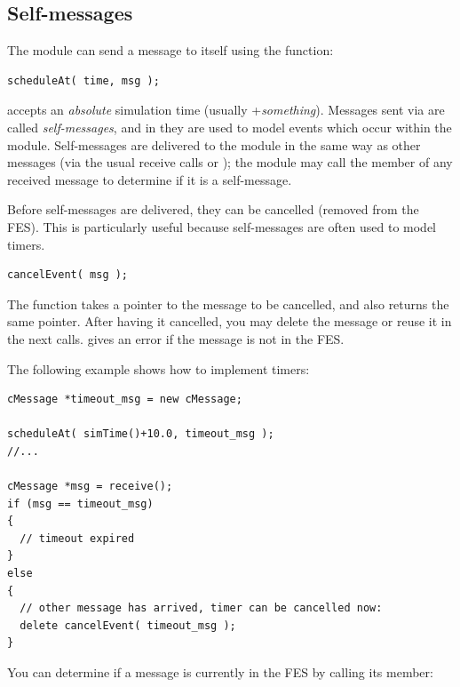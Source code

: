 \subsection{Self-messages}
\label{sec:ch-sim-lib:self-messages}

The module can send a message to itself using the
 function:

\begin{verbatim}
scheduleAt( time, msg );
\end{verbatim}

 accepts an \textit{absolute} simulation time
(usually +\textit{something}).  Messages sent via
 are called \textit{self-messages}, and in {\opp}
they are used to model events which occur within the module.
Self-messages are delivered to the module in the same way as other
messages (via the usual receive calls or ); the
module may call the  member of any received
message to determine if it is a self-message.


Before self-messages are delivered, they can be
cancelled
(removed from the FES). This is particularly useful because
self-messages are often used to model timers.

\begin{verbatim}
cancelEvent( msg );
\end{verbatim}


The  function takes a pointer to the message to
be cancelled, and also returns the same pointer. After having it
cancelled, you may delete the message or reuse it in the next
 calls.  gives an error if
the message is not in the FES.

The following example shows how to implement timers:

\begin{verbatim}
cMessage *timeout_msg = new cMessage;

scheduleAt( simTime()+10.0, timeout_msg );
//...

cMessage *msg = receive();
if (msg == timeout_msg)
{
  // timeout expired
}
else
{
  // other message has arrived, timer can be cancelled now:
  delete cancelEvent( timeout_msg );
}
\end{verbatim}

You can determine if a message is currently in the FES by calling
its  member:

